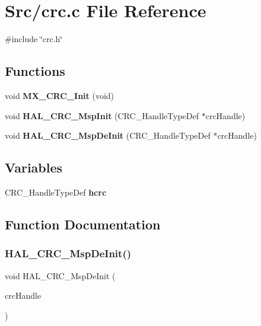 \section{Src/crc.c File Reference}
\label{crc_8c}
{\ttfamily \#include \char`\"{}crc.\+h\char`\"{}}\newline
\subsection*{Functions}
\begin{DoxyCompactItemize}
\item 
void \textbf{ M\+X\+\_\+\+C\+R\+C\+\_\+\+Init} (void)
\item 
void \textbf{ H\+A\+L\+\_\+\+C\+R\+C\+\_\+\+Msp\+Init} (C\+R\+C\+\_\+\+Handle\+Type\+Def $\ast$crc\+Handle)
\item 
void \textbf{ H\+A\+L\+\_\+\+C\+R\+C\+\_\+\+Msp\+De\+Init} (C\+R\+C\+\_\+\+Handle\+Type\+Def $\ast$crc\+Handle)
\end{DoxyCompactItemize}
\subsection*{Variables}
\begin{DoxyCompactItemize}
\item 
C\+R\+C\+\_\+\+Handle\+Type\+Def \textbf{ hcrc}
\end{DoxyCompactItemize}


\subsection{Function Documentation}
\mbox{\label{crc_8c_a8807b5fa440bf4a65515720c5f37891d}} 
\subsubsection{H\+A\+L\+\_\+\+C\+R\+C\+\_\+\+Msp\+De\+Init()}
{\footnotesize\ttfamily void H\+A\+L\+\_\+\+C\+R\+C\+\_\+\+Msp\+De\+Init (\begin{DoxyParamCaption}\item[{C\+R\+C\+\_\+\+Handle\+Type\+Def $\ast$}]{crc\+Handle }\end{DoxyParamCaption})}

\mbox{\label{crc_8c_ae1f38188a289878bd5f589bf496b5754}} 
